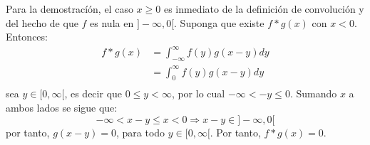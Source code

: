 \documentclass[12pt]{report}
\theoremstyle{largebreak}
\begin{document}
    \begin{sol}
        Para la demostracíón, el caso $x\geq0$ es inmediato de la definición de convolución y del hecho de que $f$ es nula en $]-\infty,0[$. Suponga que existe $f*g(x)$ con $x<0$. Entonces:
        \begin{equation*}
            \begin{split}
                f*g(x)&=\int_{-\infty}^\infty f(y)g(x-y)dy\\
                &=\int_{0}^\infty f(y)g(x-y)dy\\
            \end{split}
        \end{equation*}
        sea $y\in[0,\infty[$, es decir que $0\leq y<\infty$, por lo cual $-\infty<-y\leq0$. Sumando $x$ a ambos lados se sigue que:
        \begin{equation*}
            -\infty<x-y\leq x<0\Rightarrow x-y\in ]-\infty,0[
        \end{equation*}
        por tanto, $g(x-y)=0$, para todo $y\in[0,\infty[$. Por tanto, $f*g(x)=0$.


\end{sol}
\end{document}

